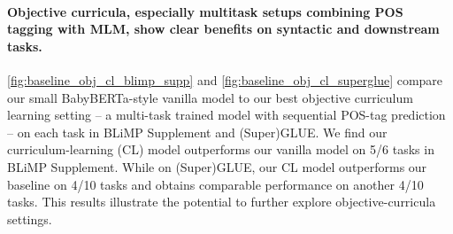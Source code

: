 \paragraph{Objective curricula, especially multitask setups combining POS tagging with MLM, show clear benefits on syntactic and downstream tasks.} \cref{fig:baseline_obj_cl_blimp_supp} and \cref{fig:baseline_obj_cl_superglue} compare our small BabyBERTa-style vanilla  model to our best objective curriculum learning setting -- a multi-task trained model with sequential POS-tag prediction -- on each task in BLiMP Supplement and (Super)GLUE. We find our curriculum-learning (CL) model outperforms our vanilla model on 5/6 tasks in BLiMP Supplement. While on (Super)GLUE, our CL model outperforms our baseline on 4/10 tasks and obtains comparable performance on another 4/10 tasks. This results illustrate the potential to further explore objective-curricula settings.


